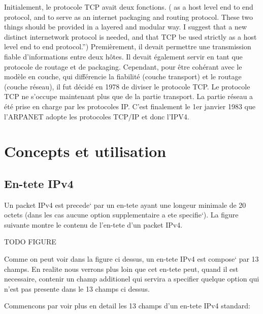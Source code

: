 \documentclass[twoside,openright,a4paper,11pt,french]{article}
\begin{document}
Initialement, le protocole TCP avait deux fonctions. ( as a host level end to end protocol, and to serve as an internet packaging and routing protocol. These two things should be provided in a layered and modular way. I suggest that a new distinct internetwork protocol is needed, and that TCP be used strictly as a host level end to end protocol.”) Premièrement, il devait permettre une transmission fiable d'informations entre deux hôtes. Il devait également servir en tant que protocole de routage et de packaging. Cependant, pour être cohérant avec le modèle en couche, qui différencie la fiabilité (couche transport) et le routage (couche réseau), il fut décidé en 1978 de diviser le protocole TCP. Le protocole TCP ne s'occupe maintenant plus que de la partie transport. La partie réseau a été prise en charge par les protocoles IP.
C'est finalement le 1er janvier 1983 que l'ARPANET adopte les protocoles TCP/IP et donc l'IPV4. 


\section{Concepts et utilisation}

\subsection{En-tete IPv4}
Un packet IPv4 est precede` par un en-tete ayant une longeur minimale de 20 octets 
(dans les cas aucune option supplementaire a ete specifie`).
La figure suivante montre le contenu de l'en-tete d'un packet IPv4.


TODO FIGURE


Comme on peut voir dans la figure ci dessus, un en-tete IPv4 est compose` par
13 champs. En realite nous verrons plus loin que cet en-tete peut, quand il est
necessaire, contenir un champ additionel qui servira a specifier quelque
option qui n'est pas presente dans le 13 champs ci dessus.


Commencons par voir plus en detail les 13 champs d'un en-tete IPv4 standard:
\end{document}

